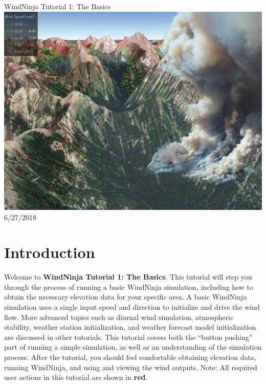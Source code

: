 \documentclass[12pt]{article}
\begin{document}
\begin{titlepage}
    \centering
    {\Huge
        WindNinja Tutorial 1:
        The Basics
    }    
    \vfill
    \includegraphics[scale=0.35]							{title_fig.jpg}
    \vfill
  	{\Huge
	  6/27/2018 %
  	}
    \vfill
\end{titlepage}

\section*{Introduction}
\noindent
Welcome to \textbf{WindNinja Tutorial 1: The Basics}.  This tutorial will step you through the process of running a basic WindNinja simulation, including how to obtain the necessary elevation data for your specific area.  A basic WindNinja simulation uses a single input speed and direction to initialize and drive the wind flow.  More advanced topics such as diurnal wind simulation, atmospheric stability, weather station initialization, and weather forecast model initialization are discussed in other tutorials.  This tutorial covers both the “button pushing” part of running a simple simulation, as well as an understanding of the simulation process.  After the tutorial, you should feel comfortable obtaining elevation data, running WindNinja, and using and viewing the wind outputs.
\newline\break
Note:  All required user actions in this tutorial are shown in     \textbf{\color{red} red}.
\end{document}
